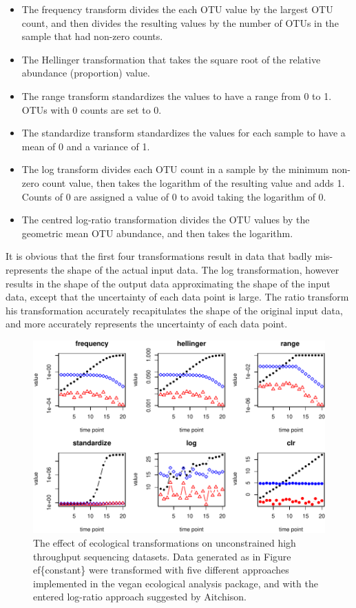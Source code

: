 \documentclass[twocolumn]{article}
\begin{document}
\begin{itemize}
\item
  The frequency transform divides the each OTU value by the largest OTU
  count, and then divides the resulting values by the number of OTUs in
  the sample that had non-zero counts.
\item
  The Hellinger transformation that takes the square root of the
  relative abundance (proportion) value.
\item
  The range transform standardizes the values to have a range from 0 to
  1. OTUs with 0 counts are set to 0.
\item
  The standardize transform standardizes the values for each sample to
  have a mean of 0 and a variance of 1.
\item
  The log transform divides each OTU count in a sample by the minimum
  non-zero count value, then takes the logarithm of the resulting value
  and adds 1. Counts of 0 are assigned a value of 0 to avoid taking the
  logarithm of 0.
\item
  The centred log-ratio transformation divides the OTU values by the
  geometric mean OTU abundance, and then takes the logarithm.
\end{itemize}

It is obvious that the first four transformations result in data that
badly mis-represents the shape of the actual input data. The log
transformation, however results in the shape of the output data
approximating the shape of the input data, except that the uncertainty
of each data point is large. The ratio transform his transformation
accurately recapitulates the shape of the original input data, and more
accurately represents the uncertainty of each data point.

\begin{figure}[htbp]
\centering
\includegraphics{main_files/figure-latex/R_block_transformations-1.pdf}
\caption{\label{transforms} The effect of ecological transformations on
unconstrained high throughput sequencing datasets. Data generated as in
Figure ef\{constant\} were transformed with five different approaches
implemented in the vegan ecological analysis package, and with the
entered log-ratio approach suggested by Aitchison.}
\end{figure}
\end{document}
